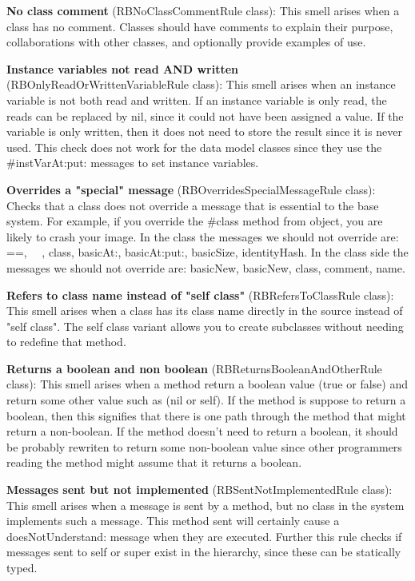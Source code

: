 \textbf{No class comment} (RBNoClassCommentRule class): This smell arises when a class has no comment. Classes should have comments to explain their purpose, collaborations with other classes, and optionally provide examples of use.

\textbf{Instance variables not read AND written} (RBOnlyReadOrWrittenVariableRule class): This smell arises when an instance variable is not both read and written. If an instance variable is only read, the reads can be replaced by nil, since it could not have been assigned a value. If the variable is only written, then it does not need to store the result since it is never used. This check does not work for the data model classes since they use the \#instVarAt:put: messages to set instance variables.

\textbf{Overrides a "special" message} (RBOverridesSpecialMessageRule class): Checks that a class does not override a message that is essential to the base system. For example, if you override the \#class method from object, you are likely to crash your image.
In the class the messages we should not override are: ==, ~~, class, basicAt:, basicAt:put:, basicSize, identityHash.
In the class side the messages we should not override are: basicNew, basicNew, class, comment, name.

\textbf{Refers to class name instead of "self class"} (RBRefersToClassRule class): This smell arises when a class has its class name directly in the source instead of "self class". The self class variant allows you to create subclasses without needing to redefine that method.

\textbf{Returns a boolean and non boolean} (RBReturnsBooleanAndOtherRule class): This smell arises when a method return a boolean value (true or false) and return some other value such as (nil or self). If the method is suppose to return a boolean, then this signifies that there is one path through the method that might return a non-boolean. If the method doesn't need to return a boolean, it should be probably rewriten to return some non-boolean value since other programmers reading the method might assume that it returns a boolean.

\textbf{Messages sent but not implemented} (RBSentNotImplementedRule class): This smell arises when a message is sent by a method,  but no class in the system implements such a message. This method sent will certainly cause a doesNotUnderstand: message when they are executed.  Further this rule checks if messages sent to self or super exist in the hierarchy, since these can be statically typed.

